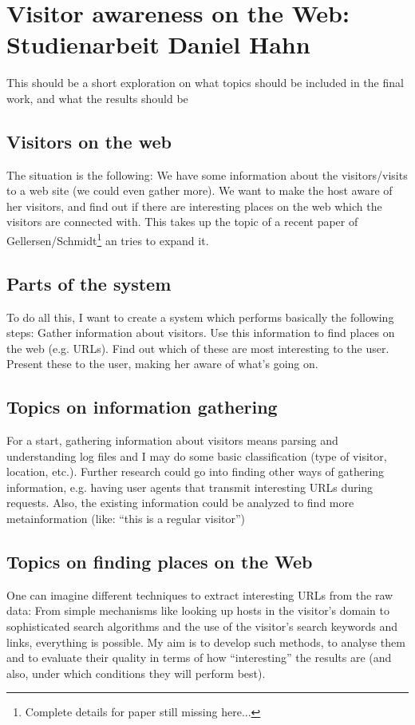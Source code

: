 \documentclass[a4paper]{danarticle}
\begin{document}
  \section{Visitor awareness on the Web: Studienarbeit Daniel Hahn}
    This should be a short exploration on what topics should be included in the
    final work, and what the results should be
    \subsection{Visitors on the web}
      The situation is the following: We have some information about the
      visitors/visits to a web site (we could even gather more). We want to make
      the host aware of her visitors, and find out if there are interesting
      places on the web which the visitors are connected with. This takes up the
      topic of a recent paper of Gellersen/Schmidt\footnote{Complete details
      for paper still missing here...} an tries to expand it.
    \subsection{Parts of the system}
      To do all this, I want to create a system which performs basically the
      following steps: Gather information about visitors. Use this information
      to find places on the web (e.g. URLs). Find out which of these are most
      interesting to the user. Present these to the user, making her aware of
      what's going on.
      \subsection{Topics on information gathering}
        For a start, gathering information about visitors means parsing and
	understanding log files and I may do some basic classification (type of
	visitor, location, etc.). Further research could go into finding other
	ways of gathering information, e.g. having user agents that
	transmit interesting URLs during requests. Also, the existing
	information could be analyzed to find more metainformation (like: "`this
	is a regular visitor"')
      \subsection{Topics on finding places on the Web}
        One can imagine different techniques to extract interesting URLs from
	the raw data: From simple mechanisms like looking up hosts in the
	visitor's domain to sophisticated search algorithms and the use of the
	visitor's search keywords and links, everything is possible.
	My aim is to develop such methods, to analyse them and to evaluate their
	quality in terms of how "`interesting"' the results are (and also, under
	which conditions they will perform best).
\end{document}
